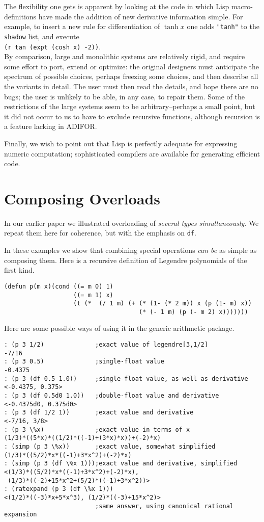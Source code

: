 \documentclass{article}
\begin{document}
{{{The flexibility one gets is apparent by looking at the code in which
Lisp macro-definitions have made the addition of new derivative
information simple. For example, to insert a new rule for
differentiation of $\tanh x$ one adds {\tt "tanh"} to the {\tt shadow}
list, and execute\\
 {\tt (r tan (expt (cosh x) -2))}.\\ 
By comparison,
large and monolithic systems are relatively rigid, and require some
effort to port, extend or optimize: the original designers must
anticipate the spectrum of possible choices, perhaps freezing some
choices, and then describe all the variants in detail. The user must
then read the details, and hope there are no bugs; the user is
unlikely to be able, in any case, to repair them.  Some of the
restrictions of the large systems seem to be arbitrary--perhaps a
small point, but it did not occur to us to have to exclude recursive
functions, although recursion is a feature lacking in ADIFOR.

Finally, we wish to point out that Lisp is perfectly adequate for
expressing numeric computation; sophisticated compilers are
available for generating efficient code.
{\section{Composing Overloads}


In our earlier paper we illustrated
 overloading of {\em several types simultaneously}. We repeat them
here for coherence, but with the emphasis on {\tt df}.

In these examples we show that combining special
operations {\em can be} as simple as composing them.
Here is a recursive definition of Legendre polynomials of the first kind.

\begin{verbatim}
(defun p(m x)(cond ((= m 0) 1)
                   ((= m 1) x)
                   (t (*  (/ 1 m) (+ (* (1- (* 2 m)) x (p (1- m) x))
                                     (* (- 1 m) (p (- m 2) x)))))))
\end{verbatim}
Here are some possible ways of using it in the generic arithmetic package.
\begin{verbatim}
: (p 3 1/2)              ;exact value of legendre[3,1/2]
-7/16
: (p 3 0.5)              ;single-float value
-0.4375
: (p 3 (df 0.5 1.0))     ;single-float value, as well as derivative
<-0.4375, 0.375>
: (p 3 (df 0.5d0 1.0))   ;double-float value and derivative
<-0.4375d0, 0.375d0>
: (p 3 (df 1/2 1))       ;exact value and derivative
<-7/16, 3/8>
: (p 3 \%x)              ;exact value in terms of x
(1/3)*((5*x)*((1/2)*((-1)+(3*x)*x))+(-2)*x)
: (simp (p 3 \%x))       ;exact value, somewhat simplified
(1/3)*((5/2)*x*((-1)+3*x^2)+(-2)*x)
: (simp (p 3 (df \%x 1)));exact value and derivative, simplified
<(1/3)*((5/2)*x*((-1)+3*x^2)+(-2)*x), 
 (1/3)*((-2)+15*x^2+(5/2)*((-1)+3*x^2))>
: (ratexpand (p 3 (df \%x 1))) 
<(1/2)*((-3)*x+5*x^3), (1/2)*((-3)+15*x^2)>
                         ;same answer, using canonical rational expansion
\end{verbatim}

}}}}
\end{document}
